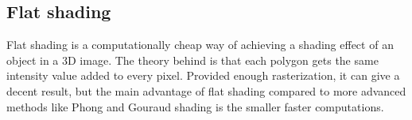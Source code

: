 \subsection{Flat shading}

Flat shading is a computationally cheap way of achieving a shading effect of an
object in a 3D image. The theory behind is that each polygon gets the same
intensity value added to every pixel. Provided enough rasterization, it can
give a decent result, but the main advantage of flat shading compared to more
advanced methods like Phong and Gouraud shading is the smaller faster computations. 
